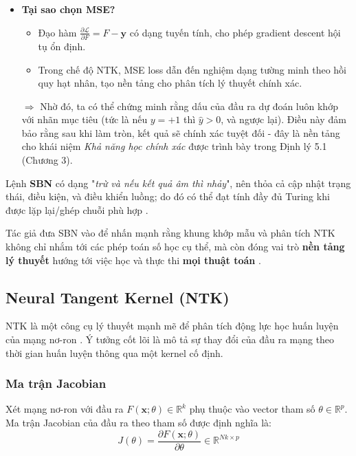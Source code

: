 \begin{enumerate}
    \begin{itemize}
      \item \textbf{Tại sao chọn MSE?}
      \begin{itemize}
          \item Đạo hàm $\frac{\partial \mathcal{L}}{\partial F} = F - \mathbf{y}$ có dạng tuyến tính, cho phép gradient descent hội tụ ổn định.
          \item Trong chế độ NTK, MSE loss dẫn đến nghiệm dạng tường minh theo hồi quy hạt nhân, tạo nền tảng cho phân tích lý thuyết chính xác.
      \end{itemize}
      $\Rightarrow$ Nhờ đó, ta có thể chứng minh rằng dấu của đầu ra dự đoán luôn khớp với nhãn mục tiêu (tức là nếu $y = +1$ thì $\hat{y} > 0$, và ngược lại). Điều này đảm bảo rằng sau khi làm tròn, kết quả sẽ chính xác tuyệt đối - đây là nền tảng cho khái niệm \textit{Khả năng học chính xác} được trình bày trong Định lý 5.1 (Chương 3).
    \end{itemize}
\end{enumerate}

Lệnh \textbf{SBN} có dạng "\textit{trừ và nếu kết quả âm thì nhảy}", nên thỏa cả cập nhật trạng thái, điều kiện, và điều khiển luồng; do đó có thể đạt tính đầy đủ Turing khi được lặp lại/ghép chuỗi phù hợp \cite{minsky_1967,hopcroft_ullman_1979}.

Tác giả đưa SBN vào để nhấn mạnh rằng khung khớp mẫu và phân tích NTK không chỉ nhắm tới các phép toán số học cụ thể, mà còn đóng vai trò \textbf{nền tảng lý thuyết} hướng tới việc học và thực thi \textbf{mọi thuật toán} \cite{de_luca_2025}.

\subsection{Neural Tangent Kernel (NTK)}

NTK là một công cụ lý thuyết mạnh mẽ để phân tích động lực học huấn luyện của mạng nơ-ron \cite{jacot_2018}. Ý tưởng cốt lõi là mô tả sự thay đổi của đầu ra mạng theo thời gian huấn luyện thông qua một kernel cố định.

\subsubsection{Ma trận Jacobian}

Xét mạng nơ-ron với đầu ra $F(\mathbf{x}; \theta) \in \mathbb{R}^k$ phụ thuộc vào vector tham số $\theta \in \mathbb{R}^p$. Ma trận Jacobian của đầu ra theo tham số được định nghĩa là:
\begin{equation}
    J(\theta) = \frac{\partial F(\mathbf{x}; \theta)}{\partial \theta} \in \mathbb{R}^{Nk \times p}
\end{equation}

